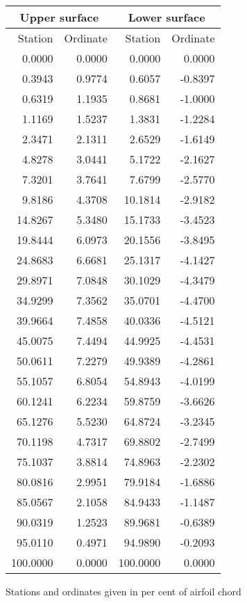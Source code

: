 \documentclass[11pt]{book}
\begin{document}
 \hspace{4mm}
 \begin{tabular}{|r|r|r|r|} \hline 
 \multicolumn{2}{|c|}{Upper surface} & \multicolumn{2}{|c|}{Lower surface} \\
 \hline
 Station & Ordinate & Station & Ordinate \\
 \hline
0.0000 & 0.0000 & 0.0000 & 0.0000 \\
0.3943 & 0.9774 & 0.6057 & -0.8397 \\
0.6319 & 1.1935 & 0.8681 & -1.0000 \\
1.1169 & 1.5237 & 1.3831 & -1.2284 \\
2.3471 & 2.1311 & 2.6529 & -1.6149 \\
4.8278 & 3.0441 & 5.1722 & -2.1627 \\
7.3201 & 3.7641 & 7.6799 & -2.5770 \\
9.8186 & 4.3708 & 10.1814 & -2.9182 \\
14.8267 & 5.3480 & 15.1733 & -3.4523 \\
19.8444 & 6.0973 & 20.1556 & -3.8495 \\
24.8683 & 6.6681 & 25.1317 & -4.1427 \\
29.8971 & 7.0848 & 30.1029 & -4.3479 \\
34.9299 & 7.3562 & 35.0701 & -4.4700 \\
39.9664 & 7.4858 & 40.0336 & -4.5121 \\
45.0075 & 7.4494 & 44.9925 & -4.4531 \\
50.0611 & 7.2279 & 49.9389 & -4.2861 \\
55.1057 & 6.8054 & 54.8943 & -4.0199 \\
60.1241 & 6.2234 & 59.8759 & -3.6626 \\
65.1276 & 5.5230 & 64.8724 & -3.2345 \\
70.1198 & 4.7317 & 69.8802 & -2.7499 \\
75.1037 & 3.8814 & 74.8963 & -2.2302 \\
80.0816 & 2.9951 & 79.9184 & -1.6886 \\
85.0567 & 2.1058 & 84.9433 & -1.1487 \\
90.0319 & 1.2523 & 89.9681 & -0.6389 \\
95.0110 & 0.4971 & 94.9890 & -0.2093 \\
100.0000 & 0.0000 & 100.0000 & 0.0000 \\
 \hline 
 \end{tabular}
 \vspace{8mm}

Stations and ordinates given in per cent of airfoil chord
\end{document}

